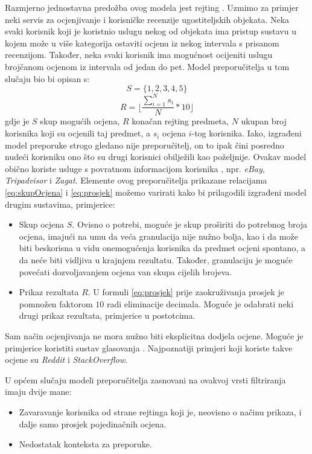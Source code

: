 \documentclass[times, utf8, diplomski, numeric]{fer}
\begin{document}
Razmjerno jednostavna predožba ovog modela jest rejting .
Uzmimo za primjer neki servis za ocjenjivanje i korisničke recenzije
ugostiteljskih objekata. Neka svaki korisnik koji je koristnio uslugu nekog od
objekata ima pristup sustavu u kojem može u više kategorija ostaviti ocjenu iz
nekog intervala s prisanom recenzijom. Također, neka svaki korisnik ima
mogućnost ocijeniti uslugu brojčanom ocjenom iz intervala od jedan do pet. Model
preporučitelja u tom slučaju bio bi opisan s:
\begin{equation}
\label{eq:skupOcjena}
	S = \{1, 2, 3, 4, 5\}
\end{equation}
\begin{equation}
\label{eq:prosjek}
	R = \lfloor \frac{\sum_{i=1}^{N} s_i}{N} \ast 10 \rfloor
\end{equation}
gdje je $S$ skup mogućih ocjena, $R$ konačan rejting predmeta, $N$ ukupan broj
korisnika koji su ocjenili taj predmet, a $s_i$ ocjena $i$-tog korisnika. Iako,
izgrađeni model preporuke strogo gledano nije preporučitelj, on to ipak čini
posredno nudeći korisniku ono što su drugi korisnici obilježili kao poželjnije.
Ovakav model obično koriste usluge s povratnom informacijom korisnika
, npr. \emph{eBay}, \emph{Tripadvisor} i \emph{Zagat}.
Elemente ovog preporučitelja prikazane relacijama \ref{eq:skupOcjena} i
\ref{eq:prosjek} možemo varirati kako bi prilagodili izgrađeni model drugim
sustavima, primjerice:
\begin{itemize}
  \item Skup ocjena $S$. Ovisno o potrebi, moguće je skup proširiti do potrebnog
  broja ocjena, imajući na umu da veća granulacija nije nužno bolja, kao i da
  može biti beskorisna u vidu onemogućenja korisnika da predmet ocjeni spontano,
  a da neće biti vidljiva u krajnjem rezultatu. Također, granulaciju je moguće
  povećati dozvoljavanjem ocjena van skupa cijelih brojeva.
  \item Prikaz rezultata $R$. U formuli \ref{eq:prosjek} prije zaokruživanja
  prosjek je pomnožen faktorom $10$ radi eliminacije decimala. Moguće je
  odabrati neki drugi prikaz rezultata, primjerice u postotcima.
\end{itemize}
Sam način ocjenjivanja ne mora nužno biti eksplicitna dodjela ocjene. Moguće je
primjerice koristiti sustav glasovanja  .
Najpoznatiji primjeri koji koriste takve ocjene su \emph{Reddit} i \emph{StackOverflow}.

U općem slučaju modeli preporučitelja zasnovani na ovakvoj vrsti filtriranja
imaju dvije mane:
\begin{itemize}
  \item Zavaravanje korisnika od strane rejtinga koji je, neovisno o načinu
  prikaza, i dalje samo prosjek pojedinačnih ocjena.
  \item Nedostatak konteksta za preporuke.
\end{itemize}
\end{document}
